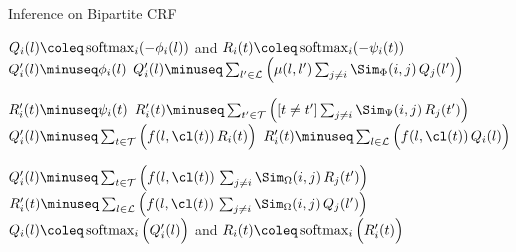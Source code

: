 \begin{algorithm*}
  \caption{Inference on Bipartite CRF \label{alg:infer}}
  \begin{algorithmic}[1]
      \State $Q_i(l) \coleq \operatorname{softmax}_i(-\phi_i(l))$ and $R_i(t) \coleq \operatorname{softmax}_i(-\psi_i(t))$
        \State $Q'_i(l) \minuseq \phi_i(l)$ 
        \State $Q'_i(l) \minuseq \sum_{l' \in \mathcal{L}} \left(\mu(l, l')\sum_{j \neq i}{\Sim_\Phi(i, j)\,Q_j(l')}\right)$ 
        
        \State $R'_i(t) \minuseq \psi_i(t)$ 
        \State $R'_i(t) \minuseq \sum_{t' \in \mathcal{T}} \left([t \neq t']\sum_{j \neq i}{\Sim_\Psi(i, j)\,R_j(t')}\right)$ 
        \State $Q'_i(l) \minuseq \sum_{t \in \mathcal{T}} \Big( f(l, \cl(t))\, R_i(t)\Big)$
        \State $R'_i(t) \minuseq \sum_{l \in \mathcal{L}} \Big( f(l, \cl(t))\, Q_i(l) \Big)$ 

		\State $Q'_i(l) \minuseq \sum_{t \in \mathcal{T}} \left( f(l, \cl(t))\, \sum_{j \neq i}{\Sim_\Omega(i, j)\,R_j(t')} \right)$
		\State $R'_i(t) \minuseq \sum_{l \in \mathcal{L}} \left( f(l, \cl(t))\, \sum_{j \neq i}\Sim_\Omega(i, j)\,Q_j(l')\right)$ 
		\State $Q_i(l) \coleq \operatorname{softmax}_i\Big(Q'_i(l)\Big)$ and $R_i(t) \coleq \operatorname{softmax}_i\Big(R'_i(t)\Big)$ 
      \EndWhile
  \end{algorithmic}
\end{algorithm*} 
